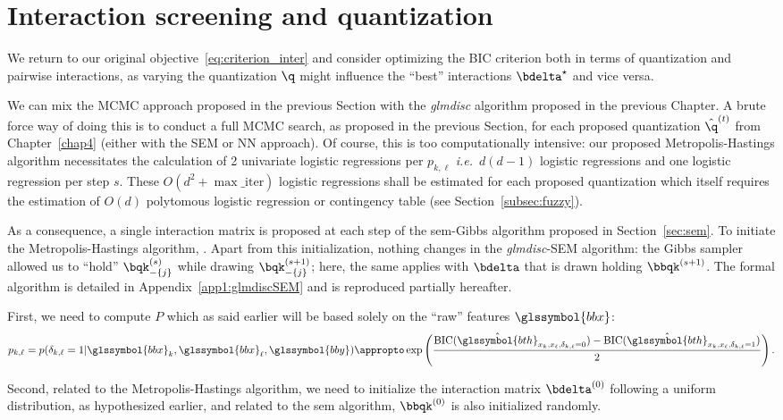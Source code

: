 \section{Interaction screening and quantization}

We return to our original objective~\ref{eq:criterion_inter} and consider optimizing the BIC criterion both in terms of quantization and pairwise interactions, as varying the quantization $\q$ might influence the ``best'' interactions $\bdelta^\star$ and vice versa.

We can mix the MCMC approach proposed in the previous Section with the \textit{glmdisc} algorithm proposed in the previous Chapter. A brute force way of doing this is to conduct a full MCMC search, as proposed in the previous Section, for each proposed quantization $\hat{\q}^{(t)}$ from Chapter~\ref{chap4} (either with the SEM or NN approach). Of course, this is too computationally intensive: our proposed Metropolis-Hastings algorithm necessitates the calculation of 2 univariate logistic regressions per $p_{k,\ell}$ \textit{i.e.}\ $d(d-1)$ logistic regressions and one logistic regression per step $s$. These $O(d^2 + \max\_{\text{iter}})$ logistic regressions shall be estimated for each proposed quantization which itself requires the estimation of $O(d)$ polytomous logistic regression or contingency table (see Section~\ref{subsec:fuzzy}).

As a consequence, a single interaction matrix is proposed at each step of the \gls{sem}-Gibbs algorithm proposed in Section~\ref{sec:sem}. To initiate the Metropolis-Hastings algorithm, . Apart from this initialization, nothing changes in the \textit{glmdisc}-SEM algorithm: the Gibbs sampler allowed us to ``hold'' $\bqk_{-\{j\}}^{(s)}$ while drawing $\bqk_{-\{j\}}^{(s+1)}$; here, the same applies with $\bdelta$ that is drawn holding $\bbqk^{(s+1)}$. The formal algorithm is detailed in Appendix~\ref{app1:glmdiscSEM} and is reproduced partially hereafter.

First, we need to compute $P$ which as said earlier will be based solely on the ``raw'' features $\glssymbol{bbx}$:
\[ p_{k,\ell} = p(\delta_{k,\ell} = 1 | \glssymbol{bbx}_k, \glssymbol{bbx}_\ell, \glssymbol{bby}) \appropto \exp \left( \frac{\text{BIC}(\hat{\glssymbol{bth}}_{x_k,x_\ell,\delta_{k,\ell}=0}) - \text{BIC}(\hat{\glssymbol{bth}}_{x_k,x_\ell,\delta_{k,\ell}=1})}{2} \right). \]

Second, related to the Metropolis-Hastings algorithm, we need to initialize the interaction matrix $\bdelta^{(0)}$ following a uniform distribution, as hypothesized earlier, and related to the \gls{sem} algorithm, $\bbqk^{(0)}$ is also initialized randomly.

